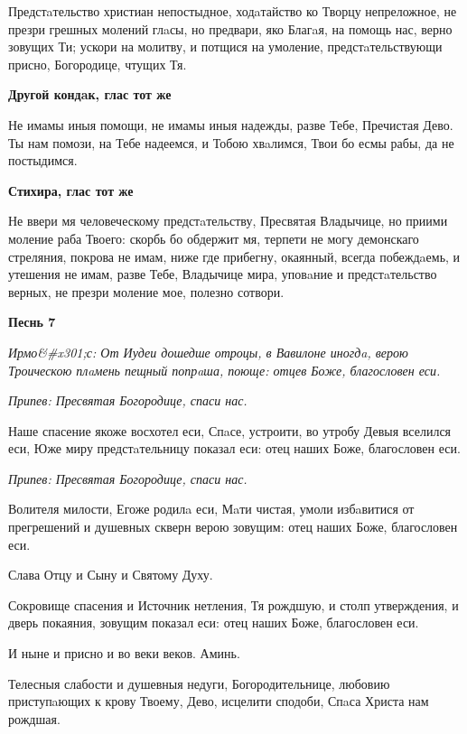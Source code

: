 Предстaтельство христиан непостыдное, ходaтайство ко Творцу непреложное, не презри грешных молений глaсы, но предвари, яко Благaя, на помощь нас, верно зовущих Ти; ускори на молитву, и потщися на умоление, предстaтельствующи присно, Богородице, чтущих Тя.




\bfseries Другой кондaк, глас тот же\normalfont{}


 Не имамы иныя помощи, не имамы иныя надежды, разве Тебе, Пречистая Дево. Ты нам помози, на Тебе надеемся, и Тобою хвaлимся, Твои бо есмы рабы, да не постыдимся.




\bfseries Стихира, глас тот же\normalfont{}


Не ввери мя человеческому предстaтельству, Пресвятая Владычице, но приими моление раба Твоего: скорбь бо обдержит мя, терпети не могу демонскаго стреляния, покрова не имам, ниже где прибегну, окаянный, всегда побеждaемь, и утешения не имам, разве Тебе, Владычице мира, уповaние и предстaтельство верных, не презри моление мое, полезно сотвори.




\bfseries Песнь 7\normalfont{}


\itshape Ирмо&#x301;с:\normalfont{} От Иудеи дошедше отроцы, в Вавилоне иногдa, верою Троическою плaмень пещный попрaша, поюще: отцев Боже, благословен еси.


\itshape Припев:\normalfont{} Пресвятая Богородице, спаси нас.


Наше спасение якоже восхотел еси, Спaсе, устроити, во утробу Девыя вселился еси, Юже миру предстaтельницу показал еси: отец наших Боже, благословен еси.


\itshape Припев:\normalfont{} Пресвятая Богородице, спаси нас.


Волителя милости, Егоже родилa еси, Мaти чистая, умоли избaвитися от прегрешений и душевных скверн верою зовущим: отец наших Боже, благословен еси.


Слава Отцу и Сыну и Святому Духу.


Сокровище спасения и Источник нетления, Тя рождшую, и столп утверждения, и дверь покаяния, зовущим показал еси: отец наших Боже, благословен еси.


И ныне и присно и во веки веков. Аминь.


Телесныя слабости и душевныя недуги, Богородительнице, любовию приступaющих к крову Твоему, Дево, исцелити сподоби, Спaса Христа нам рождшая.




